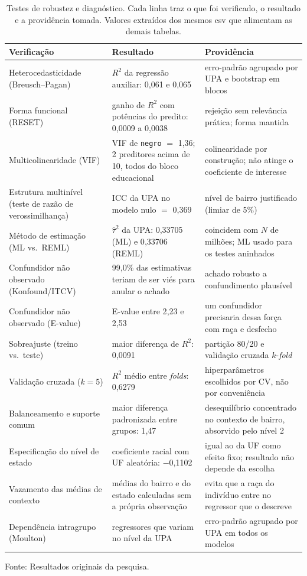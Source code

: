 \begin{table}[!ht]
\centering
\caption{Testes de robustez e diagnóstico. Cada linha traz o que foi
verificado, o resultado e a providência tomada. Valores extraídos dos
mesmos csv que alimentam as demais tabelas.}
\label{tab:robustez}
\small
\begin{tabular}{p{4.1cm}p{5.3cm}p{4.9cm}}
\toprule
Verificação & Resultado & Providência \\
\midrule
Heterocedasticidade (Breusch--Pagan) & $R^2$ da regressão auxiliar: 0{,}061 e 0{,}065 & erro-padrão agrupado por UPA e bootstrap em blocos \\
\addlinespace[2pt]
Forma funcional (RESET) & ganho de $R^2$ com potências do predito: 0{,}0009 a 0{,}0038 & rejeição sem relevância prática; forma mantida \\
\addlinespace[2pt]
Multicolinearidade (VIF) & VIF de \texttt{negro} $=$ 1{,}36; 2 preditores acima de 10, todos do bloco educacional & colinearidade por construção; não atinge o coeficiente de interesse \\
\addlinespace[2pt]
Estrutura multinível (teste de razão de verossimilhança) & ICC da UPA no modelo nulo $=$ 0{,}369 & nível de bairro justificado (limiar de 5\%) \\
\addlinespace[2pt]
Método de estimação (ML vs.\ REML) & $\hat\tau^2$ da UPA: 0{,}33705 (ML) e 0{,}33706 (REML) & coincidem com $N$ de milhões; ML usado para os testes aninhados \\
\addlinespace[2pt]
Confundidor não observado (Konfound/ITCV) & 99{,}0\% das estimativas teriam de ser viés para anular o achado & achado robusto a confundimento plausível \\
\addlinespace[2pt]
Confundidor não observado (E-value) & E-value entre 2{,}23 e 2{,}53 & um confundidor precisaria dessa força com raça e desfecho \\
\addlinespace[2pt]
Sobreajuste (treino vs.\ teste) & maior diferença de $R^2$: 0{,}0091 & partição 80/20 e validação cruzada $k$-\textit{fold} \\
\addlinespace[2pt]
Validação cruzada ($k=5$) & $R^2$ médio entre \textit{folds}: 0{,}6279 & hiperparâmetros escolhidos por CV, não por conveniência \\
\addlinespace[2pt]
Balanceamento e suporte comum & maior diferença padronizada entre grupos: 1{,}47 & desequilíbrio concentrado no contexto de bairro, absorvido pelo nível 2 \\
\addlinespace[2pt]
Especificação do nível de estado & coeficiente racial com UF aleatória: −0{,}1102 & igual ao da UF como efeito fixo; resultado não depende da escolha \\
\addlinespace[2pt]
Vazamento das médias de contexto & médias do bairro e do estado calculadas sem a própria observação & evita que a raça do indivíduo entre no regressor que o descreve \\
\addlinespace[2pt]
Dependência intragrupo (Moulton) & regressores que variam no nível da UPA & erro-padrão agrupado por UPA em todos os modelos \\
\bottomrule
\end{tabular}
\par\smallskip\footnotesize Fonte: Resultados originais da pesquisa.
\end{table}
